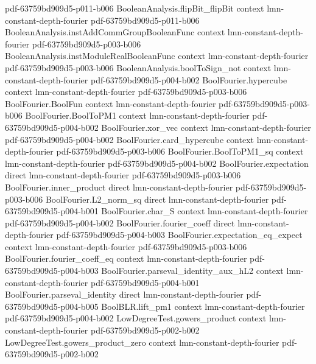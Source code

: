 \begin{lemma}
  {pdf-63759bd909d5-p011-b006}
\proofstep
  {BooleanAnalysis.flipBit_flipBit}
  {context}
  {lmn-constant-depth-fourier}
  {pdf-63759bd909d5-p011-b006}
\proofstep
  {BooleanAnalysis.instAddCommGroupBooleanFunc}
  {context}
  {lmn-constant-depth-fourier}
  {pdf-63759bd909d5-p003-b006}
\proofstep
  {BooleanAnalysis.instModuleRealBooleanFunc}
  {context}
  {lmn-constant-depth-fourier}
  {pdf-63759bd909d5-p003-b006}
\proofstep
  {BooleanAnalysis.boolToSign_not}
  {context}
  {lmn-constant-depth-fourier}
  {pdf-63759bd909d5-p004-b002}
\proofstep
  {BoolFourier.hypercube}
  {context}
  {lmn-constant-depth-fourier}
  {pdf-63759bd909d5-p003-b006}
\proofstep
  {BoolFourier.BoolFun}
  {context}
  {lmn-constant-depth-fourier}
  {pdf-63759bd909d5-p003-b006}
\proofstep
  {BoolFourier.BoolToPM1}
  {context}
  {lmn-constant-depth-fourier}
  {pdf-63759bd909d5-p004-b002}
\proofstep
  {BoolFourier.xor_vec}
  {context}
  {lmn-constant-depth-fourier}
  {pdf-63759bd909d5-p004-b002}
\proofstep
  {BoolFourier.card_hypercube}
  {context}
  {lmn-constant-depth-fourier}
  {pdf-63759bd909d5-p003-b006}
\proofstep
  {BoolFourier.BoolToPM1_sq}
  {context}
  {lmn-constant-depth-fourier}
  {pdf-63759bd909d5-p004-b002}
\proofstep
  {BoolFourier.expectation}
  {direct}
  {lmn-constant-depth-fourier}
  {pdf-63759bd909d5-p003-b006}
\proofstep
  {BoolFourier.inner_product}
  {direct}
  {lmn-constant-depth-fourier}
  {pdf-63759bd909d5-p003-b006}
\proofstep
  {BoolFourier.L2_norm_sq}
  {direct}
  {lmn-constant-depth-fourier}
  {pdf-63759bd909d5-p004-b001}
\proofstep
  {BoolFourier.char_S}
  {context}
  {lmn-constant-depth-fourier}
  {pdf-63759bd909d5-p004-b002}
\proofstep
  {BoolFourier.fourier_coeff}
  {direct}
  {lmn-constant-depth-fourier}
  {pdf-63759bd909d5-p004-b003}
\proofstep
  {BoolFourier.expectation_eq_expect}
  {context}
  {lmn-constant-depth-fourier}
  {pdf-63759bd909d5-p003-b006}
\proofstep
  {BoolFourier.fourier_coeff_eq}
  {context}
  {lmn-constant-depth-fourier}
  {pdf-63759bd909d5-p004-b003}
\proofstep
  {BoolFourier.parseval_identity_aux_hL2}
  {context}
  {lmn-constant-depth-fourier}
  {pdf-63759bd909d5-p004-b001}
\proofstep
  {BoolFourier.parseval_identity}
  {direct}
  {lmn-constant-depth-fourier}
  {pdf-63759bd909d5-p004-b005}
\proofstep
  {BoolBLR.lift_pm1}
  {context}
  {lmn-constant-depth-fourier}
  {pdf-63759bd909d5-p004-b002}
\proofstep
  {LowDegreeTest.gowers_product}
  {context}
  {lmn-constant-depth-fourier}
  {pdf-63759bd909d5-p002-b002}
\proofstep
  {LowDegreeTest.gowers_product_zero}
  {context}
  {lmn-constant-depth-fourier}
  {pdf-63759bd909d5-p002-b002}
\proofstep

\end{lemma}
